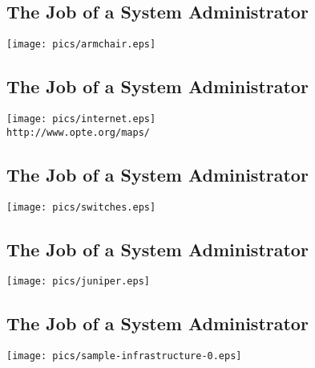 \documentclass[xga]{xdvislides}
\begin{document}
\subsection{The Job of a System Administrator}
\vspace*{\fill}
\begin{center}
	\texttt{[image: pics/armchair.eps]} \\
\end{center}
\vspace*{\fill}

\subsection{The Job of a System Administrator}
\vspace*{\fill}
\begin{center}
	\texttt{[image: pics/internet.eps]} \\
	\small
	{\tt http://www.opte.org/maps/}
	\Normalsize
\end{center}
\vspace*{\fill}

\subsection{The Job of a System Administrator}
\vspace*{\fill}
\begin{center}
	\texttt{[image: pics/switches.eps]} \\
\end{center}
\vspace*{\fill}

\subsection{The Job of a System Administrator}
\vspace*{\fill}
\begin{center}
	\texttt{[image: pics/juniper.eps]} \\
\end{center}
\vspace*{\fill}

\subsection{The Job of a System Administrator}
\vspace*{\fill}
\begin{center}
	\texttt{[image: pics/sample-infrastructure-0.eps]} \\
\end{center}
\vspace*{\fill}
\end{document}
